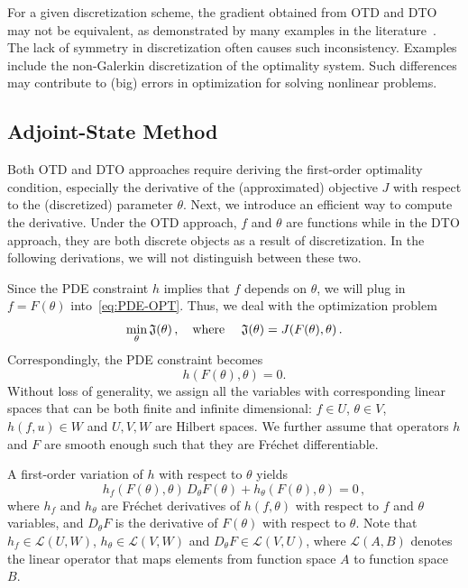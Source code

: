 \documentclass[12pt]{amsart}
\begin{document}
For a given discretization scheme, the gradient obtained from  OTD and DTO may not be equivalent, as demonstrated by many examples in the literature~\cite{hager2000runge,burkardt2002insensitive,
abraham2004effect,hinze2012discretization,liu2019non}. The lack of symmetry in discretization often causes such inconsistency. Examples include the non-Galerkin discretization of the optimality system. Such differences may contribute to (big) errors in optimization for solving nonlinear problems. 

\subsection{Adjoint-State Method}\label{subsec:adjoint}
Both OTD and DTO approaches require deriving the first-order optimality condition, especially the derivative of the (approximated) objective $J$ with respect to the (discretized) parameter $\theta$. Next, we introduce an efficient way to compute the  derivative. Under the OTD approach, $f$ and  $\theta$ are functions while in the DTO approach, they are both discrete objects as a result of discretization. In the following derivations, we will not distinguish between these two.

Since the PDE constraint $h$ implies that $f$ depends on $\theta$, we will plug in $f = F(\theta)$ into~\eqref{eq:PDE-OPT}. Thus, we deal with the optimization problem
\begin{equation}\label{eq:PDE-OPT-2}
    \min_{\theta} \mathfrak{J}(\theta)\,, \text{\quad where \quad }\mathfrak{J}(\theta)  = J(F(\theta) , \theta)\,.
\end{equation}
Correspondingly, the PDE constraint becomes
\begin{equation}\label{eq:constraint}
    h(F(\theta),\theta) = 0.
\end{equation}
 Without loss of generality, we assign all the variables with corresponding linear spaces that can be both finite and infinite dimensional:  $f \in U$,  $\theta \in V$,  $h(f,u) \in W$ and $U,V,W$ are Hilbert spaces. We further assume that operators $h$ and $F$ are smooth enough such that they are Fr\'echet differentiable.


A first-order variation of $h$ with respect to $\theta$ yields
\begin{equation} \label{eq:linear_h}
   h_f (F(\theta), \theta) \, D_\theta F(\theta) +   h_\theta (F(\theta), \theta)  = 0 \, ,
\end{equation}
where $h_f$ and $h_\theta$ are Fr\'echet derivatives of $h(f,\theta)$ with respect to $f$ and $\theta$ variables, and $D_\theta F$ is the derivative of $F(\theta)$ with respect to $\theta$. Note that $h_f \in \mathcal{L}(U,W)$, $h_\theta \in \mathcal{L}(V,W)$ and $D_\theta F \in \mathcal{L}(V,U)$, where $\mathcal{L}(A,B)$ denotes the linear operator that maps elements  from function space $A$ to function space $B$.
\end{document}
